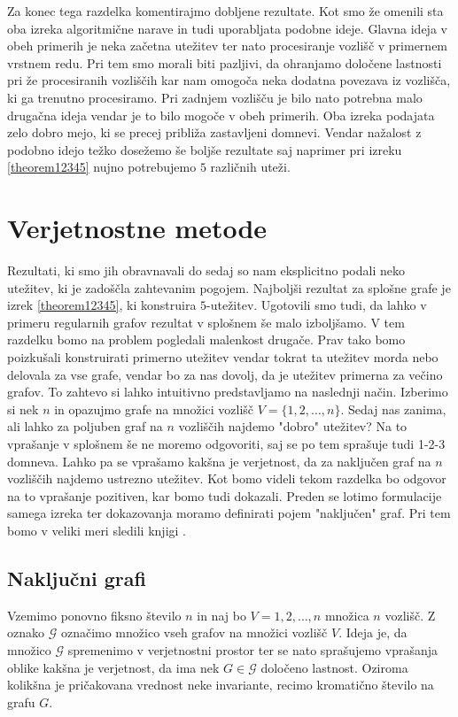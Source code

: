 \documentclass[12pt,a4paper,twoside]{article}
\theoremstyle{definition} %
\theoremstyle{plain} %
\numberwithin{equation}{section}  %
\begin{document}
Za konec tega razdelka komentirajmo dobljene rezultate. Kot smo že omenili sta oba izreka algoritmične narave in tudi uporabljata podobne ideje. Glavna ideja v obeh primerih je neka začetna utežitev ter nato procesiranje vozlišč v primernem vrstnem redu. Pri tem smo morali biti pazljivi, da ohranjamo določene lastnosti pri že procesiranih vozliščih kar nam omogoča neka dodatna povezava iz vozlišča, ki ga trenutno procesiramo. Pri zadnjem vozlišču je bilo nato potrebna malo drugačna ideja vendar je to bilo mogoče v obeh primerih. Oba izreka podajata zelo dobro mejo, ki se precej približa zastavljeni domnevi. Vendar nažalost z podobno idejo težko dosežemo še boljše rezultate saj naprimer pri izreku \ref{theorem12345} nujno potrebujemo $5$ različnih uteži.
	
 
 \section{Verjetnostne metode}

Rezultati, ki smo jih obravnavali do sedaj so nam eksplicitno podali neko utežitev, ki je zadoščla zahtevanim pogojem. Najboljši rezultat za splošne grafe je izrek \ref{theorem12345}, ki konstruira $5$-utežitev. Ugotovili smo tudi, da lahko v primeru regularnih grafov rezultat v splošnem še malo izboljšamo. V tem razdelku bomo na problem pogledali malenkost drugače. Prav tako bomo poizkušali konstruirati primerno utežitev vendar tokrat ta utežitev morda nebo delovala za vse grafe, vendar bo za nas dovolj, da je utežitev primerna za večino grafov. To zahtevo si lahko intuitivno predstavljamo na naslednji način. Izberimo si nek $n$ in opazujmo grafe na množici vozlišč $V = \{1,2, \ldots, n\}$. Sedaj nas zanima, ali lahko za poljuben graf na $n$ vozliščih najdemo "dobro" utežitev? Na to vprašanje v splošnem še ne moremo odgovoriti, saj se po tem sprašuje tudi 1-2-3 domneva. Lahko pa se vprašamo kakšna je verjetnost, da za naključen graf na $n$ vozliščih najdemo ustrezno utežitev. Kot bomo videli tekom razdelka bo odgovor na to vprašanje pozitiven, kar bomo tudi dokazali. Preden se lotimo formulacije samega izreka ter dokazovanja moramo definirati pojem "naključen" graf. Pri tem bomo v veliki meri sledili knjigi \cite{maingraph}.

\subsection{Naključni grafi}
Vzemimo ponovno fiksno število $n$ in naj bo $V = {1,2, \ldots, n}$ množica $n$ vozlišč. Z oznako $\mathcal{G}$ označimo množico vseh grafov na množici vozlišč $V$.  Ideja je, da množico $\mathcal{G}$ spremenimo v verjetnostni prostor ter se nato sprašujemo vprašanja oblike kakšna je verjetnost, da ima nek $G \in \mathcal{G}$ določeno lastnost. Oziroma kolikšna je pričakovana vrednost neke invariante, recimo kromatično število na grafu $G$.
\end{document}
